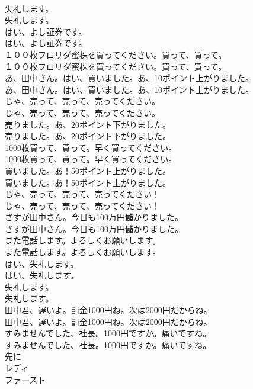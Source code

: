 \documentclass[8pt]{extreport}
\begin{document}
\begin{CJK}{UTF8}{min}
\\	失礼します。	
\\	失礼します。 
\\	はい、よし証券です。	
\\	はい、よし証券です。 
\\	１００枚フロリダ蜜株を買ってください。買って、買って。	
\\	１００枚フロリダ蜜株を買ってください。買って、買って。 
\\	あ、田中さん。はい、買いました。あ、10ポイント上がりました。	
\\	あ、田中さん。はい、買いました。あ、10ポイント上がりました。 
\\	じゃ、売って、売って、売ってください。	
\\	じゃ、売って、売って、売ってください。 
\\	売りました。あ、20ポイント下がりました。	
\\	売りました。あ、20ポイント下がりました。 
\\	1000枚買って、買って。早く買ってください。	
\\	1000枚買って、買って。早く買ってください。 
\\	買いました。あ！50ポイント上がりました。	
\\	買いました。あ！50ポイント上がりました。 
\\	じゃ、売って、売って、売ってください！	
\\	じゃ、売って、売って、売ってください！ 
\\	さすが田中さん。今日も100万円儲かりました。	
\\	さすが田中さん。今日も100万円儲かりました。 
\\	また電話します。よろしくお願いします。	
\\	また電話します。よろしくお願いします。 
\\	はい、失礼します。	
\\	はい、失礼します。 
\\	失礼します。	
\\	失礼します。 
\\	田中君、遅いよ。罰金1000円ね。次は2000円だからね。	
\\	田中君、遅いよ。罰金1000円ね。次は2000円だからね。 
\\	すみませんでした、社長。1000円ですか。痛いですね。	
\\	すみませんでした、社長。1000円ですか。痛いですね。 
\\	先に
\\	レディ
\\	ファースト

\end{CJK}
\end{document}
